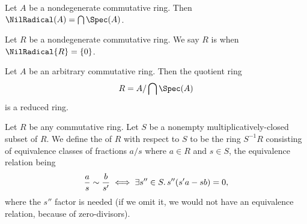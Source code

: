 \begin{theorem}
Let $A$ be a nondegenerate commutative ring.
Then $\NilRadical(A)=\Intersects\Spec(A)$.
\end{theorem}

\begin{definition}
Let $R$ be a nondegenerate commutative ring.
We say $R$ is  when $\NilRadical{R}=\{0\}$.
\end{definition}

\begin{theorem}
Let $A$ be an arbitrary commutative ring. Then the quotient ring
\begin{equation*}
R = A/\bigcap\Spec(A)
\end{equation*}
is a reduced ring.
\end{theorem}

\begin{definition}
Let $R$ be any commutative ring.
Let $S$ be a nonempty multiplicatively-closed subset of $R$.
We define the  of $R$ with respect to $S$ to be
the ring $S^{-1}R$ consisting of equivalence classes of fractions
$a/s$ where $a\in R$ and $s\in S$, the equivalence relation being
\begin{equation}
\frac{a}{s}\sim\frac{b}{s'}\iff\exists s''\in S\ldotp s''(s'a-sb)=0,
\end{equation}
where the $s''$ factor is needed (if we omit it, we would not have an
equivalence relation, because of zero-divisors).
\end{definition}